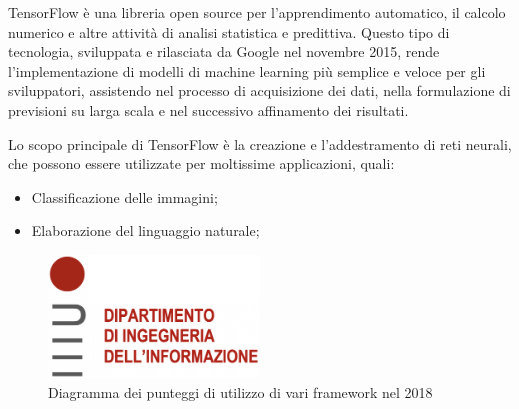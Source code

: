 TensorFlow è una libreria open source per l'apprendimento automatico, il calcolo numerico e altre attività di analisi statistica e predittiva.
Questo tipo di tecnologia, sviluppata e rilasciata da Google nel novembre 2015, rende l’implementazione di modelli di machine learning più semplice e
veloce per gli sviluppatori, assistendo nel processo di acquisizione dei dati, nella formulazione di previsioni su larga scala e nel successivo affinamento
dei risultati.

Lo scopo principale di TensorFlow è la creazione e l’addestramento di reti neurali, che possono essere utilizzate per moltissime applicazioni, quali:
\begin{itemize}
    \item Classificazione delle immagini;
    \item Elaborazione del linguaggio naturale;
\end{itemize}

\begin{figure}
    \centering
    \includegraphics[width=0.5\textwidth]{Immagini/logo_dei.png}
    \caption{Diagramma dei punteggi di utilizzo di vari framework nel 2018}
    \label{fig:diagramma}
\end{figure}

